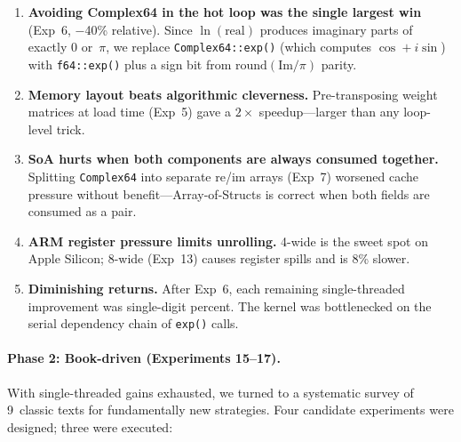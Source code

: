 \documentclass[acmsmall,nonacm]{acmart}
\begin{document}
\begin{enumerate}
\item \textbf{Avoiding Complex64 in the hot loop was the single
largest win} (Exp~6, $-$40\% relative).  Since $\ln(\text{real})$
produces imaginary parts of exactly $0$ or~$\pi$, we replace
\texttt{Complex64::exp()} (which computes $\cos + i\sin$) with
\texttt{f64::exp()} plus a sign bit from $\mathrm{round}(\mathrm{Im}/\pi)$ parity.

\item \textbf{Memory layout beats algorithmic cleverness.}
Pre-transposing weight matrices at load time (Exp~5) gave a
$2{\times}$ speedup---larger than any loop-level trick.

\item \textbf{SoA hurts when both components are always consumed
together.}  Splitting \texttt{Complex64} into separate re/im arrays
(Exp~7) worsened cache pressure without benefit---Array-of-Structs
is correct when both fields are consumed as a pair.

\item \textbf{ARM register pressure limits unrolling.}  4-wide is the
sweet spot on Apple Silicon; 8-wide (Exp~13) causes register spills
and is 8\% slower.

\item \textbf{Diminishing returns.}  After Exp~6, each remaining
single-threaded improvement was single-digit percent.  The kernel was
bottlenecked on the serial dependency chain of \texttt{exp()} calls.
\end{enumerate}

\paragraph{Phase 2: Book-driven (Experiments 15--17).}

With single-threaded gains exhausted, we turned to a systematic survey
of 9~classic texts for fundamentally new strategies.  Four candidate
experiments were designed; three were executed:
\end{document}
